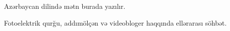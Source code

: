 \documentclass{article}
\begin{document}
Azərbaycan dilində mətn burada yazılır.

Fotoelektrik qurğu, addımölçən və videobloger haqqında ellərarası söhbət.
\end{document}
